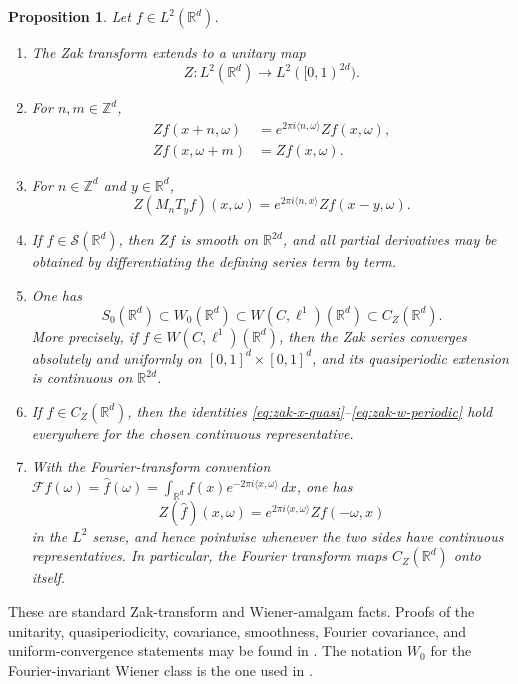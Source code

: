 \documentclass[11pt,reqno]{amsart}
\numberwithin{equation}{section}
\newtheorem{proposition}[theorem]{Proposition}
\theoremstyle{definition}
\theoremstyle{remark}
\newcommand{\R}{\mathbb R}
\newcommand{\Z}{\mathbb Z}
\newcommand{\Sclass}{\mathcal S}
\newcommand{\ip}[2]{\langle #1,#2\rangle}
\newcommand{\CZ}{C_Z}
\newcommand{\Szero}{S_0}
\newcommand{\Wiener}{W(C,\ell^1)}
\newcommand{\Wzero}{W_0}
\begin{document}
\begin{proposition}\label{prop:zak-standard}
Let $f\in L^2(\R^d)$.
\begin{enumerate}[label=\textup{(\roman*)}]
\item The Zak transform extends to a unitary map
\[
 Z:L^2(\R^d)\longrightarrow L^2([0,1)^{2d}).
\]
\item For $n,m\in\Z^d$,
\begin{align}
 Zf(x+n,\omega)&=e^{2\pi i\ip{n}{\omega}}Zf(x,\omega),
                                                        \label{eq:zak-x-quasi}\\
 Zf(x,\omega+m)&=Zf(x,\omega).          \label{eq:zak-w-periodic}
\end{align}
\item For $n\in\Z^d$ and $y\in\R^d$,
\begin{equation}\label{eq:zak-covariance}
 Z(M_nT_yf)(x,\omega)
   =e^{2\pi i\ip{n}{x}}Zf(x-y,\omega).
\end{equation}
\item If $f\in\Sclass(\R^d)$, then $Zf$ is smooth on $\R^{2d}$, and
all partial derivatives may be obtained by differentiating the defining
series term by term.
\item One has
\[
 \Szero(\R^d)
 \subset \Wzero(\R^d)
 \subset \Wiener(\R^d)
 \subset \CZ(\R^d).
\]
More precisely, if $f\in\Wiener(\R^d)$, then the Zak series converges
absolutely and uniformly on $[0,1]^d\times[0,1]^d$, and its quasiperiodic
extension is continuous on $\R^{2d}$.
\item If $f\in\CZ(\R^d)$, then the identities
\eqref{eq:zak-x-quasi}--\eqref{eq:zak-w-periodic} hold everywhere for the
chosen continuous representative.
\item With the Fourier-transform convention $\mathcal Ff(\omega)=\widehat f(\omega)=\int_{\R^d}f(x)e^{-2\pi i\ip{x}{\omega}}\,dx$, one has
\begin{equation}\label{eq:zak-fourier-covariance}
 Z(\widehat f)(x,\omega)
 =e^{2\pi i\ip{x}{\omega}}Zf(-\omega,x)
\end{equation}
in the $L^2$ sense, and hence pointwise whenever the two sides have
continuous representatives.  In particular, the Fourier transform maps
$\CZ(\R^d)$ onto itself.
\end{enumerate}
\end{proposition}

These are standard Zak-transform and Wiener-amalgam facts.  Proofs of the
unitarity, quasiperiodicity, covariance, smoothness, Fourier covariance, and
uniform-convergence statements may be found in
\cite[Chapter~8 and Chapters~11--12]{Grochenig2001}.  The notation
$\Wzero$ for the Fourier-invariant Wiener class is the one used in
\cite{deDiosLiehrTaylor2026}.
\end{document}
